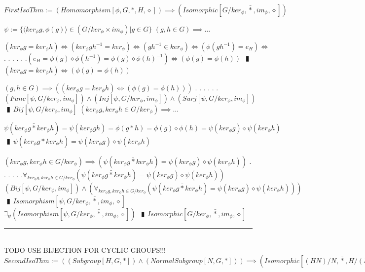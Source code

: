 \documentclass{book}
\newcommand{\abr}{:=}
\newcommand{\cont}{\phantom{.}. . .\phantom{.}}
\newcommand{\pipe}{$\phantom{(}\vrectangleblack\phantom{)}$}
\newcommand{\pr}[1]{\left(#1\right)}
\newcommand{\bbin}[1]{\mathbin{{\bar{#1}}}}
\begin{document}
$FirstIsoThm \abr (Homomorphism[\phi, G, *, H, \diamond]) \implies (Isomorphic[G / ker_\phi, \bbin{*}, im_\phi, \diamond])$
\begin{enumerate}
  \lit $\psi \abr \{\langle ker_\phi g, \phi(g) \rangle \in (G / ker_\phi \times im_\phi) | g \in G\}$
  \lit $(g, h \in G) \implies \ldots$
  \begin{enumerate}
     \lit $(ker_\phi g = ker_\phi h) \iff (ker_\phi g h^{-1} = ker_\phi) \iff (g h^{-1} \in ker_\phi) \iff \pr{\phi(g h^{-1}) = e_H} \iff$ \cont
     \lit \cont $\pr{e_H = \phi(g) \diamond \phi(h^{-1}) = \phi(g) \diamond \phi(h)^{-1}} \iff \pr{\phi(g) = \phi(h)}$ \pipe $(ker_\phi g = ker_\phi h) \iff \pr{\phi(g) = \phi(h)}$
   \end{enumerate}
  \lit $(g, h \in G) \implies \pr{(ker_\phi g = ker_\phi h) \iff \pr{\phi(g) = \phi(h)}}$ \cont
  \lit \cont $(Func[\psi, G / ker_\phi, im_\phi]) \land (Inj[\psi, G / ker_\phi, im_\phi]) \land (Surj[\psi, G / ker_\phi, im_\phi])$ \pipe $Bij[\psi, G / ker_\phi, im_\phi]$ %
  \lit $(ker_\phi g, ker_\phi h \in G / ker_\phi) \implies \ldots$
  \begin{enumerate}
    \lit $\psi(ker_\phi g \bbin{*} ker_\phi h) = \psi(ker_\phi g h) = \phi(g * h) = \phi(g) \diamond \phi(h) = \psi(ker_\phi g) \diamond \psi(ker_\phi h)$ \pipe $\psi(ker_\phi g \bbin{*} ker_\phi h) = \psi(ker_\phi g) \diamond \psi(ker_\phi h)$
  \end{enumerate}
  \lit $(ker_\phi g, ker_\phi h \in G / ker_\phi) \implies \pr{\psi(ker_\phi g \bbin{*} ker_\phi h) = \psi(ker_\phi g) \diamond \psi(ker_\phi h)}$ \cont
  \lit \cont $\forall_{ker_\phi g, ker_\phi h \in G / ker_\phi}\pr{\psi(ker_\phi g \bbin{*} ker_\phi h) = \psi(ker_\phi g) \diamond \psi(ker_\phi h)}$
  \lit $(Bij[\psi, G / ker_\phi, im_\phi]) \land \pr{\forall_{ker_\phi g, ker_\phi h \in G / ker_\phi}\pr{\psi(ker_\phi g {\bbin{*}} ker_\phi h) = \psi(ker_\phi g) \diamond \psi(ker_\phi h)}}$ \pipe $Isomorphism[\psi, G / ker_\phi, \bbin{*}, im_\phi, \diamond]$
  \lit $\exists_{\psi}(Isomorphism[\psi, G / ker_\phi, \bbin{*}, im_\phi, \diamond])$ \pipe $Isomorphic[G / ker_\phi, \bbin{*}, im_\phi, \diamond]$
\end{enumerate} \vspace{.75mm} \hrule \vspace{.75mm} \ \\ 
TODO USE BIJECTION FOR CYCLIC GROUPS!!!
$SecondIsoThm \abr \pr{(Subgroup[H, G, *]) \land (NormalSubgroup[N, G, *])} \implies \pr{Isomorphic[(H N) / N, \bbin{*}, H / (H \cap N), \bbin{*}]}$
\end{document}
